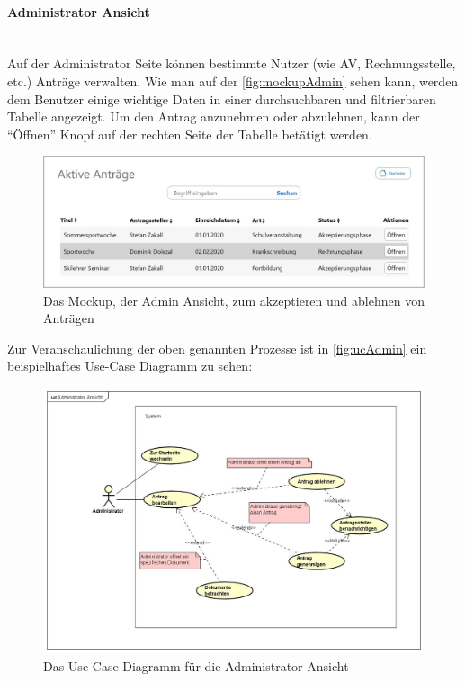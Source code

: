 \paragraph{Administrator Ansicht}
~\\
Auf der Administrator Seite können bestimmte Nutzer (wie AV, Rechnungsstelle, etc.) Anträge verwalten. Wie man auf der \autoref{fig:mockupAdmin} sehen kann, werden dem Benutzer einige wichtige Daten in einer durchsuchbaren und filtrierbaren Tabelle angezeigt. Um den Antrag anzunehmen oder abzulehnen, kann der \enquote{Öffnen} Knopf auf der rechten Seite der Tabelle betätigt werden.
\begin{figure}[H]
	\centering
	\includegraphics[width=1\linewidth]{images/ldehner_konzept/Mockup-Admin}
	\caption[Mockup Adminansicht]{Das Mockup, der Admin Ansicht, zum akzeptieren und ablehnen von Anträgen}
	\label{fig:mockupAdmin}
\end{figure}
Zur Veranschaulichung der oben genannten Prozesse ist in \autoref{fig:ucAdmin} ein beispielhaftes Use-Case Diagramm zu sehen: 
\begin{figure}[H]
	\centering
	\includegraphics[width=1\linewidth]{images/ldehner_konzept/uc-admin}
	\caption[Use Case Diagramm Adminansicht]{Das Use Case Diagramm für die Administrator Ansicht}
	\label{fig:ucAdmin}
\end{figure}
